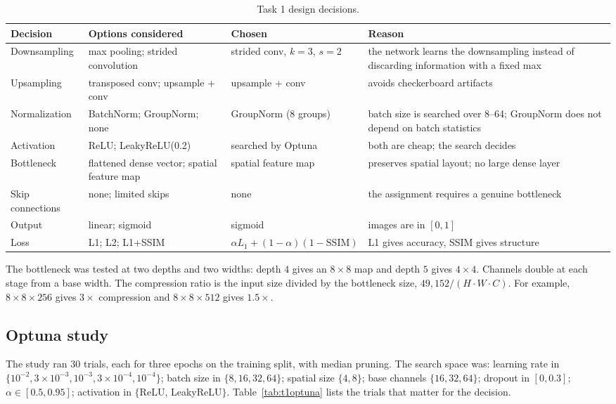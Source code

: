 \documentclass[conference]{IEEEtran}
\begin{document}
\begin{table}[t]
\centering
\caption{Task 1 design decisions.}
\label{tab:t1choices}
\begin{tabular}{@{}p{2.6cm}p{5.2cm}p{5.2cm}p{4.2cm}@{}}
\toprule
Decision & Options considered & Chosen & Reason \\
\midrule
Downsampling & max pooling; strided convolution & strided conv, $k{=}3$, $s{=}2$ & the network learns the downsampling instead of discarding information with a fixed max \\
Upsampling & transposed conv; upsample + conv & upsample + conv & avoids checkerboard artifacts~\cite{odena2016checkerboard} \\
Normalization & BatchNorm; GroupNorm; none & GroupNorm (8 groups) & batch size is searched over 8--64; GroupNorm does not depend on batch statistics~\cite{wu2018gn} \\
Activation & ReLU; LeakyReLU(0.2) & searched by Optuna & both are cheap; the search decides \\
Bottleneck & flattened dense vector; spatial feature map & spatial feature map & preserves spatial layout; no large dense layer \\
Skip connections & none; limited skips & none & the assignment requires a genuine bottleneck \\
Output & linear; sigmoid & sigmoid & images are in $[0,1]$ \\
Loss & L1; L2; L1+SSIM & $\alpha L_1+(1-\alpha)(1-\mathrm{SSIM})$ & L1 gives accuracy, SSIM gives structure~\cite{zhao2017loss,wang2004ssim} \\
\bottomrule
\end{tabular}
\end{table}

The bottleneck was tested at two depths and two widths: depth $4$ gives an $8\times8$ map and depth $5$
gives $4\times4$. Channels double at each stage from a base width. The compression ratio is the input
size divided by the bottleneck size, $49{,}152/(H\cdot W\cdot C)$. For example, $8\times8\times256$
gives $3\times$ compression and $8\times8\times512$ gives $1.5\times$.

\subsection{Optuna study}
The study ran 30 trials, each for three epochs on the training split, with median pruning. The
search space was: learning rate in $\{10^{-2},3\times10^{-3},10^{-3},3\times10^{-4},10^{-4}\}$; batch size
in $\{8,16,32,64\}$; spatial size $\{4,8\}$; base channels $\{16,32,64\}$; dropout in $[0,0.3]$;
$\alpha\in[0.5,0.95]$; activation in $\{$ReLU, LeakyReLU$\}$. Table~\ref{tab:t1optuna} lists the
trials that matter for the decision.
\end{document}
